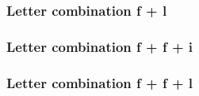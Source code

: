\documentclass{article}
\begin{document}
\subsubsection{Letter combination f + l}
\begin{otherlanguage}{german}
\end{otherlanguage}

\subsubsection{Letter combination f + f + i}
\begin{otherlanguage}{german}
\end{otherlanguage}

\subsubsection{Letter combination f + f + l}
\begin{otherlanguage}{german}
\end{otherlanguage}
\end{document}
